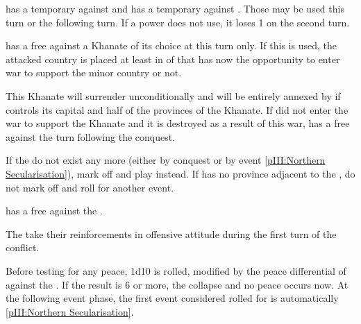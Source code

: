 
\phevnt
\aparag \RUS has a temporary \CB against \POL and \POL has a temporary \CB
against \RUS. Those \CB may be used this turn or the following turn. If a
power does not use, it loses 1 \STAB on the second turn.






\phdipl
\aparag \RUS has a free \CB against a Khanate of its choice at this turn only.
\aparag If this \CB is used, the attacked country is placed at least in \AM of
\TUR that has now the opportunity to enter war to support the minor country or
not.

\phpaix
\aparag This Khanate will surrender unconditionally and will be entirely
annexed by \RUS if \RUS controls its capital and half of the provinces of the
Khanate.
\aparag If \TUR did not enter the war to support the Khanate and it is
destroyed as a result of this war, \TUR has a free \CB against \RUS the turn
following the conquest.





\condition{}
\aparag If the  do not exist any more (either by conquest
or by event \ref{pIII:Northern Secularisation}), mark off and play \RD
instead.
\aparag If \RUS has no province adjacent to the , do not
mark off and roll for another event.

\phevnt
\aparag \RUS has a free \CB against the .

\phadm
\aparag The  take their reinforcements in offensive
attitude during the first turn of the conflict.

\phpaix
\aparag Before testing for any peace, 1d10 is rolled, modified by the peace
differential of \RUS against the . If the result is 6 or
more, the  collapse and no peace occurs now. At the
following event phase, the first event considered rolled for is automatically
\ref{pIII:Northern Secularisation}.



